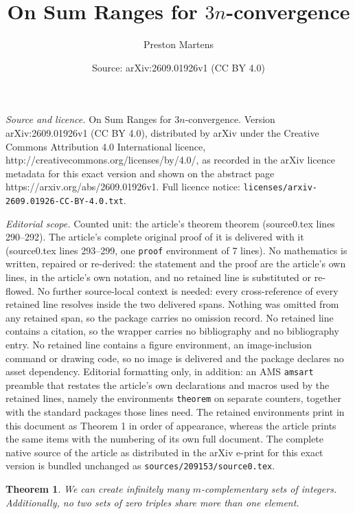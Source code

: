 \documentclass[10pt,a4paper]{amsart}
\title{On Sum Ranges for $3n$-convergence}
\author{Preston Martens}
\date{Source: arXiv:2609.01926v1 (CC BY 4.0)}
\newtheorem{theorem}{Theorem}
\begin{document}
\maketitle

\noindent\emph{Source and licence.} On Sum Ranges for $3n$-convergence. Version arXiv:2609.01926v1 (CC BY 4.0), distributed by arXiv under the Creative Commons Attribution 4.0 International licence, http://creativecommons.org/licenses/by/4.0/, as recorded in the arXiv licence metadata for this exact version and shown on the abstract page https://arxiv.org/abs/2609.01926v1. Full licence notice: \texttt{licenses/arxiv-2609.01926-CC-BY-4.0.txt}.\par\smallskip

\noindent\textit{Editorial scope.} Counted unit: the article's theorem theorem (source0.tex lines 290--292). The article's complete original proof of it is delivered with it (source0.tex lines 293--299, one \texttt{proof} environment of 7 lines). No mathematics is written, repaired or re-derived: the statement and the proof are the article's own lines, in the article's own notation, and no retained line is substituted or re-flowed.  No further source-local context is needed: every cross-reference of every retained line resolves inside the two delivered spans.  Nothing was omitted from any retained span, so the package carries no omission record.  No retained line contains a citation, so the wrapper carries no bibliography and no bibliography entry.  No retained line contains a figure environment, an image-inclusion command or drawing code, so no image is delivered and the package declares no asset dependency.  Editorial formatting only, in addition: an AMS \texttt{amsart} preamble that restates the article's own declarations and macros used by the retained lines, namely the environments \texttt{theorem} on separate counters, together with the standard packages those lines need.  The retained environments print in this document as Theorem 1 in order of appearance, whereas the article prints the same items with the numbering of its own full document.  The complete native source of the article as distributed in the arXiv e-print for this exact version is bundled unchanged as \texttt{sources/209153/source0.tex}.
\begin{theorem}
    We can create infinitely many $m$-complementary sets of integers. Additionally, no two sets of zero triples share more than one element.
\end{theorem}
\end{document}
